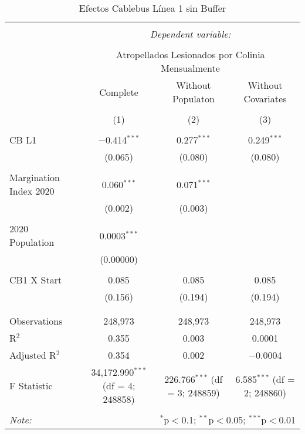 
\begin{table}[!htbp] \centering 
  \caption{Efectos Cablebus Línea 1 sin Buffer} 
  \label{} 
\begin{tabular}{@{\extracolsep{5pt}}lccc} 
\\[-1.8ex]\hline 
\hline \\[-1.8ex] 
 & \multicolumn{3}{c}{\textit{Dependent variable:}} \\ 
\cline{2-4} 
\\[-1.8ex] & \multicolumn{3}{c}{Atropellados Lesionados por Colinia Mensualmente} \\ 
 & Complete & Without Populaton & Without Covariates \\ 
\\[-1.8ex] & (1) & (2) & (3)\\ 
\hline \\[-1.8ex] 
 CB L1 & $-$0.414$^{***}$ & 0.277$^{***}$ & 0.249$^{***}$ \\ 
  & (0.065) & (0.080) & (0.080) \\ 
  & & & \\ 
 Margination Index 2020 & 0.060$^{***}$ & 0.071$^{***}$ &  \\ 
  & (0.002) & (0.003) &  \\ 
  & & & \\ 
 2020 Population & 0.0003$^{***}$ &  &  \\ 
  & (0.00000) &  &  \\ 
  & & & \\ 
 CB1 X Start & 0.085 & 0.085 & 0.085 \\ 
  & (0.156) & (0.194) & (0.194) \\ 
  & & & \\ 
\hline \\[-1.8ex] 
Observations & 248,973 & 248,973 & 248,973 \\ 
R$^{2}$ & 0.355 & 0.003 & 0.0001 \\ 
Adjusted R$^{2}$ & 0.354 & 0.002 & $-$0.0004 \\ 
F Statistic & 34,172.990$^{***}$ (df = 4; 248858) & 226.766$^{***}$ (df = 3; 248859) & 6.585$^{***}$ (df = 2; 248860) \\ 
\hline 
\hline \\[-1.8ex] 
\textit{Note:}  & \multicolumn{3}{r}{$^{*}$p$<$0.1; $^{**}$p$<$0.05; $^{***}$p$<$0.01} \\ 
\end{tabular} 
\end{table} 

